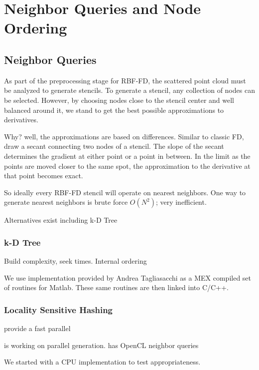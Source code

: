 
\chapter{Neighbor Queries and Node Ordering}


\section{Neighbor Queries} 

As part of the preprocessing stage for RBF-FD, the scattered point cloud must
be analyzed to generate stencils. To generate a stencil, any collection of
nodes can be selected. However, by choosing nodes close to the stencil center
and well balanced around it, we stand to get the best possible approximations
to derivatives. 

Why? well, the approximations are based on differences. Similar to classic FD,
draw a secant connecting two nodes of a stencil. The slope of the secant
determines the gradient at either point or a point in between. In the limit as
the points are moved closer to the same spot, the approximation to the
derivative at that point becomes exact. 

So ideally every RBF-FD stencil will operate on nearest neighbors. One way to
generate nearest neighbors is brute force $O(N^{2})$; very inefficient. 

Alternatives exist including k-D Tree

\subsection{k-D Tree}
Build complexity, seek times. Internal ordering 

We use implementation provided by Andrea Tagliasacchi \cite{tagliasacchi} as a MEX compiled set of routines for Matlab. These same routines are then linked into C/C++. 

\subsection{Locality Sensitive Hashing}

\cite{Connor2009} provide a fast parallel 

\cite{Henke2012} is working on parallel generation. \cite{IanJohnsonThesis} has OpenCL neighbor queries

We started with a CPU implementation to test appropriateness. 

